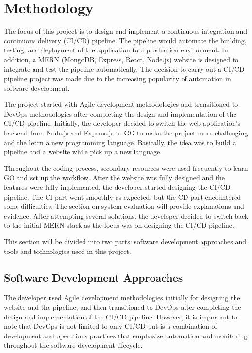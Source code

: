 \chapter{Methodology}

The focus of this project is to design and implement a continuous integration and continuous delivery (CI/CD) pipeline. The pipeline would automate the building, testing, and deployment of the application to a production environment. In addition, a MERN (MongoDB, Express, React, Node.js) website is designed to integrate and test the pipeline automatically. The decision to carry out a CI/CD pipeline project was made due to the increasing popularity of automation in software development.

The project started with Agile development methodologies and transitioned to DevOps methodologies after completing the design and implementation of the CI/CD pipeline. Initially, the developer decided to switch the web application's backend from Node.js and Express.js to GO to make the project more challenging and the learn a new programming language. Basically, the idea was to build a pipeline and a website while pick up a new language.

Throughout the coding process, secondary resources were used frequently to learn GO and set up the workflow. After the website was fully designed and the features were fully implemented, the developer started designing the CI/CD pipeline. The CI part went smoothly as expected, but the CD part encountered some difficulties. The section on system evaluation will provide explanations and evidence. After attempting several solutions, the developer decided to switch back to the initial MERN stack as the focus was on designing the CI/CD pipeline.

This section will be divided into two parts: software development approaches and tools and technologies used in this project.

\section{Software Development Approaches}

The developer used Agile development methodologies initially for designing the website and the pipeline, and then transitioned to DevOps after completing the design and implementation of the CI/CD pipeline. However, it is important to note that DevOps is not limited to only CI/CD but is a combination of development and operations practices that emphasize automation and monitoring throughout the software development lifecycle.

